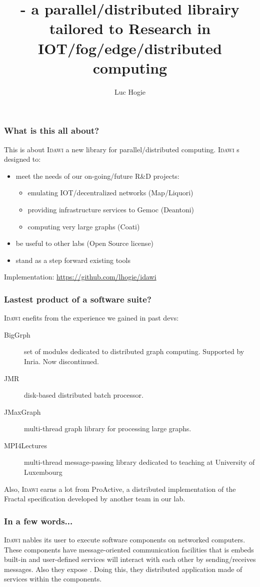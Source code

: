 \documentclass[11pt]{beamer}
\author{Luc Hogie}
\title{\idawi - a parallel/distributed librairy tailored to Research in IOT/fog/edge/distributed computing}
\institute{Cnrs/Inria/Université Côte d'Azur}
\newcommand{\idawi}[1]{\textsc{Idawi}\xspace}
\begin{document}
\begin{frame}
\titlepage
\end{frame}



\begin{frame}
\frametitle{What is this all about?}
This is about \idawi, a new library for parallel/distributed computing.
\idawi is designed to:
\begin{itemize}
	\item meet the needs of our on-going/future R\&D projects:
		\begin{itemize}
			\item emulating IOT/decentralized networks (Map/Liquori)
			\item providing infrastructure services to Gemoc (Deantoni)
			\item computing very large graphs (Coati)
		\end{itemize}
	\item be useful to other labs (Open Source license)
	\item stand as a step forward existing tools
\end{itemize}
Implementation: \url{https://github.com/lhogie/idawi}
\end{frame}


\begin{frame}
\frametitle{Lastest product of a software suite?}
\idawi benefits from the experience we gained in past devs:
\begin{description}
	\item[BigGrph] set of modules dedicated to distributed graph computing. Supported by Inria. Now discontinued.
	\item[JMR] disk-based distributed batch processor.
	\item[JMaxGraph] multi-thread graph library for  processing large graphs.
	\item[MPI4Lectures]multi-thread message-passing library dedicated to teaching at University of Luxembourg
\end{description}
Also, \idawi learns a lot from ProActive,  a distributed implementation of the Fractal specification  developed by another team in our lab.
\end{frame}


\begin{frame}
\frametitle{In a few words...}
\idawi enables its user to execute software components on networked computers. These components have message-oriented communication facilities that is embeds built-in and user-defined services   will interact with each other by sending/receives messages. Also they expose . Doing this, they  distributed application made of services within the components.
\end{frame}
\end{document}
